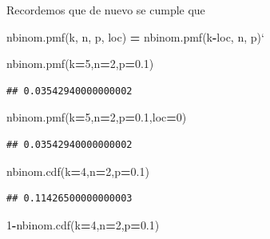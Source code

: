 \documentclass[]{book}
\newenvironment{Shaded}{\begin{snugshade}}{\end{snugshade}}
\newcommand{\DecValTok}[1]{\textcolor[rgb]{0.00,0.00,0.81}{#1}}
\newcommand{\FloatTok}[1]{\textcolor[rgb]{0.00,0.00,0.81}{#1}}
\newcommand{\NormalTok}[1]{#1}
\newcommand{\OperatorTok}[1]{\textcolor[rgb]{0.81,0.36,0.00}{\textbf{#1}}}
\begin{document}
Recordemos que de nuevo se cumple que

\begin{Shaded}
\begin{Highlighting}[]
\NormalTok{nbinom.pmf(k, n, p, loc) }\OperatorTok{=}\NormalTok{ nbinom.pmf(k}\OperatorTok{-}\NormalTok{loc, n, p)`}
\end{Highlighting}
\end{Shaded}

\begin{Shaded}
\begin{Highlighting}[]
\NormalTok{nbinom.pmf(k}\OperatorTok{=}\DecValTok{5}\NormalTok{,n}\OperatorTok{=}\DecValTok{2}\NormalTok{,p}\OperatorTok{=}\FloatTok{0.1}\NormalTok{)}
\end{Highlighting}
\end{Shaded}

\begin{verbatim}
## 0.03542940000000002
\end{verbatim}

\begin{Shaded}
\begin{Highlighting}[]
\NormalTok{nbinom.pmf(k}\OperatorTok{=}\DecValTok{5}\NormalTok{,n}\OperatorTok{=}\DecValTok{2}\NormalTok{,p}\OperatorTok{=}\FloatTok{0.1}\NormalTok{,loc}\OperatorTok{=}\DecValTok{0}\NormalTok{)}
\end{Highlighting}
\end{Shaded}

\begin{verbatim}
## 0.03542940000000002
\end{verbatim}

\begin{Shaded}
\begin{Highlighting}[]
\NormalTok{nbinom.cdf(k}\OperatorTok{=}\DecValTok{4}\NormalTok{,n}\OperatorTok{=}\DecValTok{2}\NormalTok{,p}\OperatorTok{=}\FloatTok{0.1}\NormalTok{)}
\end{Highlighting}
\end{Shaded}

\begin{verbatim}
## 0.11426500000000003
\end{verbatim}

\begin{Shaded}
\begin{Highlighting}[]
\DecValTok{1}\OperatorTok{-}\NormalTok{nbinom.cdf(k}\OperatorTok{=}\DecValTok{4}\NormalTok{,n}\OperatorTok{=}\DecValTok{2}\NormalTok{,p}\OperatorTok{=}\FloatTok{0.1}\NormalTok{)}
\end{Highlighting}
\end{Shaded}
\end{document}
